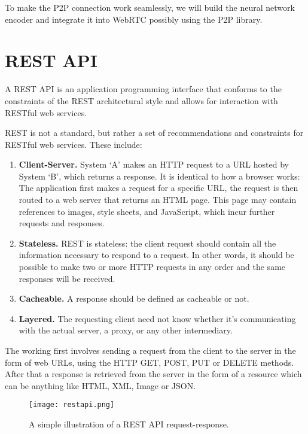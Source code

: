 To make the P2P connection work seamlessly, we will build the neural network encoder and 
integrate it into WebRTC possibly using the P2P library.

\section{REST API}

A REST API is an application programming interface that conforms to the constraints of the REST 
architectural style and allows for interaction with RESTful web services.

REST is not a standard, but rather a set of recommendations and constraints for 
RESTful web services. These include:

\begin{enumerate}
    \item \textbf{Client-Server.} System ‘A’ makes an HTTP request to a URL hosted by 
    System ‘B’, which returns a response.
    It is identical to how a browser works: The application first makes a request 
    for a specific URL, the request is then routed to a web server that returns an HTML page. 
    This page may contain references to images, style sheets, and JavaScript, 
    which incur further requests and responses.

    \item \textbf{Stateless.} REST is stateless: the client request should contain all the 
    information necessary to respond to a request. In other words, it should be possible to
    make two or more HTTP requests in any order and the same responses will be received.

    \item \textbf{Cacheable.} A response should be defined as cacheable or not.
    
    \item \textbf{Layered.} The requesting client need not know whether it’s communicating 
    with the actual server, a proxy, or any other intermediary.~\cite{DevelopersRestAPI}
\end{enumerate}

The working first involves sending a request from the client to the server in the form of web URLs, 
using the HTTP GET, POST, PUT or DELETE methods. After that a response is retrieved from the server 
in the form of a resource which can be anything like HTML, XML, Image or JSON.~\cite{WhatisRESTAPI}

\begin{figure}
    \begin{center}
        \texttt{[image: restapi.png]}
    \end{center}
    \caption{A simple illustration of a REST API request-response.}
    \label{fig:restapi}
\end{figure}

